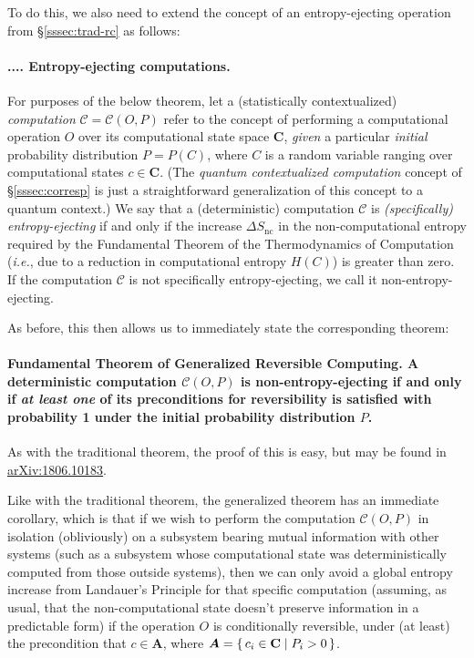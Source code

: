 \documentclass[preprints,article,accept,moreauthors,pdftex]{Definitions/mdpi}
\newcommand{\mypara}[1]{\paragraph{\arabic{section}.\arabic{subsection}.\arabic{subsubsection}.\arabic{paragraph}. #1}}
\begin{document}
\begin{paracol}{2}
To do this, we also need to extend the concept of an entropy-ejecting operation from \S\ref{sssec:trad-rc} as follows:

\mypara{Entropy-ejecting computations.}\label{par:ent-ej-comps}

For purposes of the below theorem, let a (statistically contextualized) \emph{computation} $\mathcal{C}=\mathcal{C}(O,P)$ refer to the concept of performing a computational operation $O$ over its computational state space $\mathbf{C}$, \emph{given} a particular \emph{initial} probability distribution $P=P(C)$, where $C$ is a random variable ranging over computational states $c\in\mathbf{C}$. (The \emph{quantum contextualized computation} concept of \S\ref{sssec:corresp} is just a straightforward generalization of this concept to a quantum context.) We say that a (deterministic) computation $\mathcal{C}$ is \emph{(specifically) entropy-ejecting} if and only if the increase $\Delta S_\mathrm{nc}$ in the non-computational entropy required by the Fundamental Theorem of the Thermodynamics of Computation (\emph{i.e.}, due to a reduction in computational entropy $H(C)$) is greater than zero. If the computation $\mathcal{C}$ is not specifically entropy-ejecting, we call it non-entropy-ejecting.

As before, this then allows us to immediately state the corresponding theorem:

\paragraph{\textbf{Fundamental Theorem of Generalized Reversible Computing.} A deterministic computation $\mathcal{C}(O,P)$ is non-entropy-ejecting if and only if \emph{at least one} of its preconditions for reversibility is satisfied with probability 1 under the initial probability distribution $P$.} As with the traditional theorem, the proof of this is easy, but may be found in \href{https://arxiv.org/abs/1806.10183}{arXiv:1806.10183}.

Like with the traditional theorem, the generalized theorem has an immediate corollary, which is that if we wish to perform the computation $\mathcal{C}(O,P)$ in isolation (obliviously) on a subsystem bearing mutual information with other systems (such as a subsystem whose computational state was deterministically computed from those outside systems), then we can only avoid a global entropy increase from Landauer's Principle for that specific computation (assuming, as usual, that the non-computational state doesn't preserve information in a predictable form) if the operation $O$ is conditionally reversible, under (at least) the precondition that $c\in\boldsymbol{A}$, where $\boldsymbol{A}=\set{c_i\in\mathbf{C} | P_i > 0}$.


\end{paracol}
\end{document}
